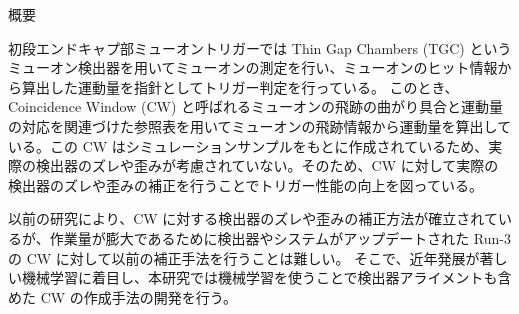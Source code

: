 \begin{center}
  \begin{huge}
    概要
  \end{huge}
\end{center}

\vspace{10pt}










初段エンドキャプ部ミューオントリガーでは Thin Gap Chambers (TGC) というミューオン検出器を用いてミューオンの測定を行い、ミューオンのヒット情報から算出した運動量を指針としてトリガー判定を行っている。
このとき、 Coincidence Window (CW) と呼ばれるミューオンの飛跡の曲がり具合と運動量の対応を関連づけた参照表を用いてミューオンの飛跡情報から運動量を算出している。この CW はシミュレーションサンプルをもとに作成されているため、実際の検出器のズレや歪みが考慮されていない。そのため、CW に対して実際の検出器のズレや歪みの補正を行うことでトリガー性能の向上を図っている。

以前の研究により、CW に対する検出器のズレや歪みの補正方法が確立されているが、作業量が膨大であるために検出器やシステムがアップデートされた Run-3 の CW に対して以前の補正手法を行うことは難しい。
そこで、近年発展が著しい機械学習に着目し、本研究では機械学習を使うことで検出器アライメントも含めた CW の作成手法の開発を行う。
